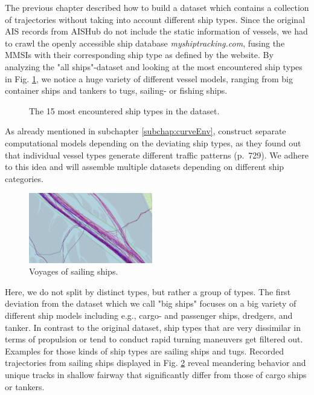 The previous chapter described how to build a dataset which contains a collection of trajectories without taking into account different ship types. Since the original AIS records from AISHub do not include the static information of vessels, we had to crawl the openly accessible ship database \textit{myshiptracking.com}, fusing the MMSIs with their corresponding ship type as defined by the website. By analyzing the "all ships"-dataset and looking at the most encountered ship types in Fig. \ref{fig:shipTypes}, we notice a huge variety of different vessel models, ranging from big container ships and tankers to tugs, sailing- or fishing ships.

\begin{figure}[H]
    \centering
    
    \caption{The 15 most encountered ship types in the dataset.}
    \label{fig:shipTypes}
\end{figure}

As already mentioned in subchapter \ref{subchap:curveEnv}, \cite{venskus2021unsupervised} construct separate computational models depending on the deviating ship types, as they found out that individual vessel types generate different traffic patterns (p.~729). We adhere to this idea and will assemble multiple datasets depending on different ship categories.
\begin{figure}
    \includegraphics[width=0.48\textwidth]{images/ais/tracks/Sailing.png}
    \caption{Voyages of sailing ships.}
    \label{fig:sailing}
\end{figure}
Here, we do not split by distinct types, but rather a group of types. The first deviation from the dataset which we call "big ships" focuses on a big variety of different ship models including e.g., cargo- and passenger ships, dredgers, and tanker.
In contrast to the original dataset, ship types that are very dissimilar in terms of propulsion or tend to conduct rapid turning maneuvers get filtered out. Examples for those kinds of ship types are sailing ships and tugs. Recorded trajectories from sailing ships displayed in Fig. \ref{fig:sailing} reveal meandering behavior and unique tracks in shallow fairway that significantly differ from those of cargo ships or tankers.

